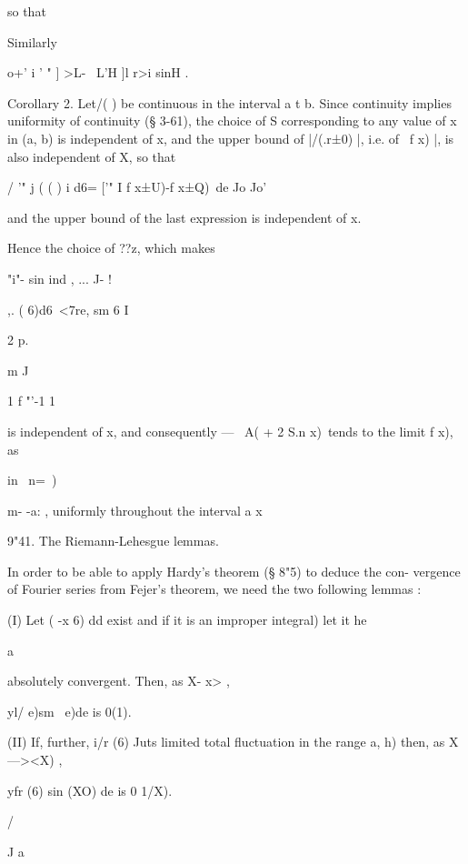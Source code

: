 so that 



Similarly 



    o+' i ' "   ] >L- \ L'H ]l r>i sinH  . 



Corollary 2. Let/( ) be continuous in the interval a t b. Since continuity implies 
uniformity of continuity (§ 3-61), the choice of S corresponding to any value of x in (a, b) 
is independent of x, and the upper bound of |/(.r±0) |, i.e. of \ f x) |, is also independent 
of X, so that 



/ '" j ( ( ) i d6= ['" I f x±U)-f x±Q)\ de 
Jo Jo' 



and the upper bound of the last expression is independent of x. 

Hence the choice of ??z, which makes 

"i"- sin ind , ... J- ! 

  ,. (  6)d6\ <7re, 
sm  6   I 



2 p. 

m J 



1 f "'-1 1 

is independent of x, and consequently — \ A( + 2 S.n x)\ tends to the limit f x), as 

in \ n=\ ) 

m- -a: , uniformly throughout the interval a  x%

9"41. The Riemann-Lehesgue lemmas. 

In order to be able to apply Hardy's theorem (§ 8"5) to deduce the con- 
vergence of Fourier series from Fejer's theorem, we need the two following 
lemmas : 

(I) Let ( -x   6) dd exist and  if it is an improper integral) let it he 

  a 

absolutely convergent. Then, as X-  x> , 

yl/ e)sm \ e)de is 0(1). 



(II) If, further, i/r (6) Juts limited total fluctuation in the range  a, h) then, 
as X—><X) , 

yfr (6) sin (XO) de is 0 1/X). 



/ 

J a 



